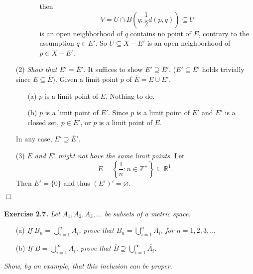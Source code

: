 \documentclass{article}
\begin{document}
\begin{enumerate}
\begin{enumerate}
\begin{enumerate}
    then
    $$V = U \cap B\left( q; \frac{1}{2}d(p,q) \right) \subseteq U$$
    is an open neighborhood of $q$ contains no point of $E$,
    contrary to the assumption $q \in E'$.
    So $U \subseteq X-E'$ is an open neighborhood of $p \in X-E'$.
    \end{enumerate}
  \end{enumerate}
\item[(2)]
\emph{Show that $E' = \overline{E}'$.}
It suffices to show $E' \supseteq \overline{E}'$.
($E' \subseteq \overline{E}'$ holds trivially since $E \subseteq \overline{E}$).
Given a limit point $p$ of $\overline{E} = E \cup E'$.
  \begin{enumerate}
  \item[(a)]
  $p$ is a limit point of $E$. Nothing to do.
  \item[(b)]
  $p$ is a limit point of $E'$.
  Since $p$ is a limit point of $E'$ and $E'$ is a closed set,
  $p \in E'$, or $p$ is a limit point of $E$.
  \end{enumerate}
In any case, $E' \supseteq \overline{E}'$.
\item[(3)]
\emph{$E$ and $E'$ might not have the same limit points.}
Let
$$E = \left\{ \frac{1}{n} : n \in \mathbb{Z}^+ \right\} \subseteq \mathbb{R}^1.$$
Then $E' = \{0\}$ and thus $(E')' = \varnothing$.
\end{enumerate}
$\Box$ \\\\






\textbf{Exercise 2.7.}
\emph{Let $A_1, A_2, A_3, ...$ be subsets of a metric space.}
\begin{enumerate}
\item[(a)]
\emph{If $B_n = \bigcup^{n}_{i=1} A_i$, prove that
$\overline{B_n} = \bigcup^{n}_{i=1}{\overline{A_i}}$, for $n = 1, 2, 3, ...$}
\item[(b)]
\emph{If $B = \bigcup^{\infty}_{i=1} A_i$,
prove that $\overline{B} \supseteq \bigcup^{\infty}_{i=1} \overline{A_i}$.}
\end{enumerate}
\emph{Show, by an example, that this inclusion can be proper. } \\
\end{document}
